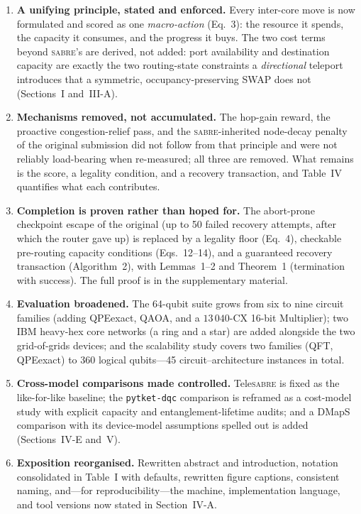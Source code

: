 \documentclass[11pt]{article}
\newcommand{\TeleSABRE}{Tele\textsc{sabre}}
\newcommand{\SABRE}{\textsc{sabre}}
\begin{document}
\begin{enumerate}[leftmargin=*,itemsep=3pt]

\item \textbf{A unifying principle, stated and enforced.} Every inter-core
move is now formulated and scored as one \emph{macro-action}
(Eq.~3): the resource it spends, the capacity it consumes, and the progress it
buys. The two cost terms beyond \SABRE{}'s are derived, not added: port
availability and destination capacity are exactly the two routing-state
constraints a \emph{directional} teleport introduces that a symmetric,
occupancy-preserving SWAP does not (Sections~I and~III-A).

\item \textbf{Mechanisms removed, not accumulated.} The hop-gain reward, the
proactive congestion-relief pass, and the \SABRE{}-inherited node-decay
penalty of the original submission did not follow from that principle and were
not reliably load-bearing when re-measured; all three are removed. What
remains is the score, a legality condition, and a recovery transaction, and
Table~IV quantifies what each contributes.

\item \textbf{Completion is proven rather than hoped for.} The abort-prone
checkpoint escape of the original (up to 50 failed recovery attempts, after
which the router gave up) is replaced by a legality floor (Eq.~4), checkable
pre-routing capacity conditions (Eqs.~12--14), and a guaranteed recovery
transaction (Algorithm~2), with Lemmas~1--2 and Theorem~1 (termination with
success). The full proof is in the supplementary material.

\item \textbf{Evaluation broadened.} The 64-qubit suite grows from six to nine
circuit families (adding QPEexact, QAOA, and a $13\,040$-CX 16-bit
Multiplier); two IBM heavy-hex core networks (a ring and a star) are added
alongside the two grid-of-grids devices; and the scalability study covers two
families (QFT, QPEexact) to 360 logical qubits---45 circuit--architecture
instances in total.

\item \textbf{Cross-model comparisons made controlled.} \TeleSABRE{} is fixed
as the like-for-like baseline; the \texttt{pytket-dqc} comparison is reframed
as a cost-model study with explicit capacity and entanglement-lifetime audits;
and a DMapS comparison with its device-model assumptions spelled out is added
(Sections~IV-E and~V).

\item \textbf{Exposition reorganised.} Rewritten abstract and introduction,
notation consolidated in Table~I with defaults, rewritten figure captions,
consistent naming, and---for reproducibility---the machine, implementation
language, and tool versions now stated in Section~IV-A.

\end{enumerate}
\end{document}
